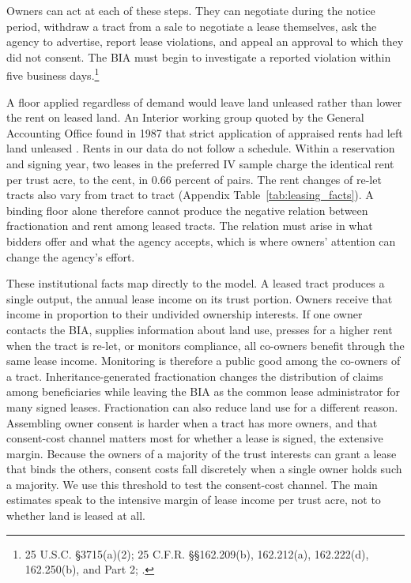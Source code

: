 \documentclass[12pt]{article}
\begin{document}
Owners can act at each of these steps. They can negotiate during the notice period, withdraw a tract from a sale to negotiate a lease themselves, ask the agency to advertise, report lease violations, and appeal an approval to which they did not consent. The BIA must begin to investigate a reported violation within five business days.\footnote{25 U.S.C. \S 3715(a)(2); 25 C.F.R. \S\S 162.209(b), 162.212(a), 162.222(d), 162.250(b), and Part 2; \citet[pp.~15--20]{BIA2006Ch2}.}

A floor applied regardless of demand would leave land unleased rather than lower the rent on leased land. An Interior working group quoted by the General Accounting Office found in 1987 that strict application of appraised rents had left land unleased \citep{GAO1999}. Rents in our data do not follow a schedule. Within a reservation and signing year, two leases in the preferred IV sample charge the identical rent per trust acre, to the cent, in 0.66 percent of pairs. The rent changes of re-let tracts also vary from tract to tract (Appendix Table~\ref{tab:leasing_facts}). A binding floor alone therefore cannot produce the negative relation between fractionation and rent among leased tracts. The relation must arise in what bidders offer and what the agency accepts, which is where owners' attention can change the agency's effort.

These institutional facts map directly to the model. A leased tract produces a single output, the annual lease income on its trust portion. Owners receive that income in proportion to their undivided ownership interests. If one owner contacts the BIA, supplies information about land use, presses for a higher rent when the tract is re-let, or monitors compliance, all co-owners benefit through the same lease income. Monitoring is therefore a public good among the co-owners of a tract. Inheritance-generated fractionation changes the distribution of claims among beneficiaries while leaving the BIA as the common lease administrator for many signed leases. Fractionation can also reduce land use for a different reason. Assembling owner consent is harder when a tract has more owners, and that consent-cost channel matters most for whether a lease is signed, the extensive margin. Because the owners of a majority of the trust interests can grant a lease that binds the others, consent costs fall discretely when a single owner holds such a majority. We use this threshold to test the consent-cost channel. The main estimates speak to the intensive margin of lease income per trust acre, not to whether land is leased at all.
\end{document}
